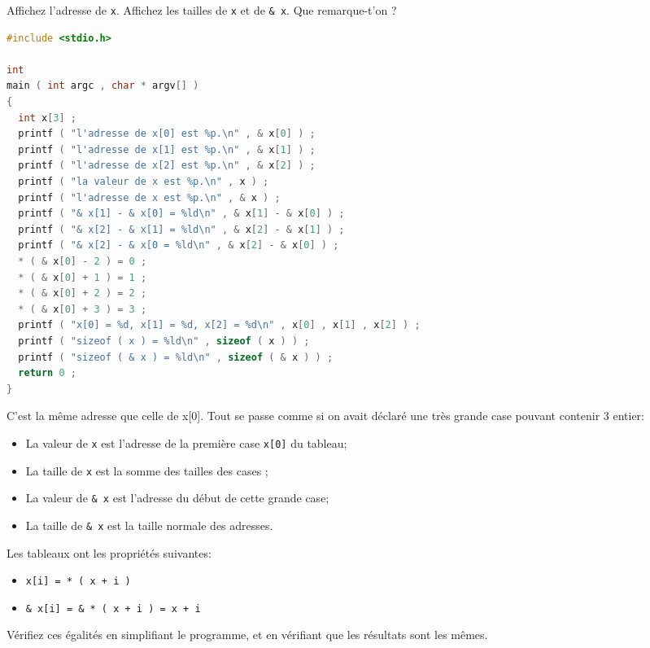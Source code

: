 \question Affichez l'adresse de \texttt{x}. Affichez les tailles de \texttt{x} et de \texttt{\& x}. Que remarque-t'on ?


\begin{solutioncachee}
  \begin{lstlisting}[language=C]
#include <stdio.h>

int
main ( int argc , char * argv[] )
{
  int x[3] ;
  printf ( "l'adresse de x[0] est %p.\n" , & x[0] ) ;
  printf ( "l'adresse de x[1] est %p.\n" , & x[1] ) ;
  printf ( "l'adresse de x[2] est %p.\n" , & x[2] ) ;
  printf ( "la valeur de x est %p.\n" , x ) ;
  printf ( "l'adresse de x est %p.\n" , & x ) ;
  printf ( "& x[1] - & x[0] = %ld\n" , & x[1] - & x[0] ) ;
  printf ( "& x[2] - & x[1] = %ld\n" , & x[2] - & x[1] ) ;
  printf ( "& x[2] - & x[0 = %ld\n" , & x[2] - & x[0] ) ;
  * ( & x[0] - 2 ) = 0 ;
  * ( & x[0] + 1 ) = 1 ;
  * ( & x[0] + 2 ) = 2 ;
  * ( & x[0] + 3 ) = 3 ;
  printf ( "x[0] = %d, x[1] = %d, x[2] = %d\n" , x[0] , x[1] , x[2] ) ;
  printf ( "sizeof ( x ) = %ld\n" , sizeof ( x ) ) ;
  printf ( "sizeof ( & x ) = %ld\n" , sizeof ( & x ) ) ;
  return 0 ;
}    
  \end{lstlisting}


  C'est la même adresse que celle de x[0]. Tout se passe comme si on
  avait déclaré une très grande case pouvant contenir 3 entier:
  \begin{itemize}
  \item La valeur de \texttt{x} est l'adresse de la première case
    \texttt{x[0]} du tableau;
  \item La taille de \texttt{x} est la somme des tailles des cases ;
  \item La valeur de \texttt{\& x} est l'adresse du début de cette grande case;
  \item La taille de \texttt{\& x} est la taille normale des adresses.
  \end{itemize}
\end{solutioncachee}

\begin{fminipage}{0.9\textwidth}
  Les tableaux ont les propriétés suivantes:
  \begin{itemize}
  \item \texttt{x[i] = * ( x + i )}
  \item \texttt{\& x[i] = \& * ( x + i ) = x + i}
  \end{itemize}
\end{fminipage}

\question Vérifiez ces égalités en simplifiant le programme, et en
vérifiant que les résultats sont les mêmes.



